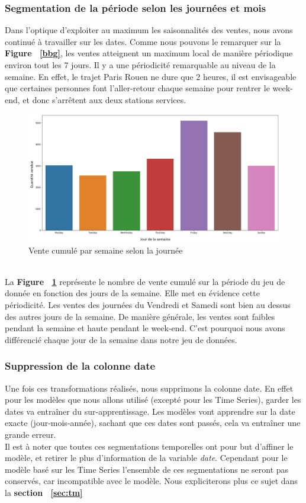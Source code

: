 \documentclass{article} %
\begin{document}
\subsubsection{Segmentation de la période selon les journées et mois}
Dans l'optique d'exploiter au maximum les saisonnalités des ventes, nous avons continué à travailler sur les dates. Comme nous pouvons le remarquer sur la \textbf{Figure ~\ref{bbg}}, les ventes atteignent un maximum local de manière périodique environ tout les 7 jours. Il y a une périodicité remarquable au niveau de la semaine. En effet, le trajet Paris Rouen ne dure que 2 heures, il est envisageable que certaines personnes font l'aller-retour chaque semaine pour rentrer le week-end, et donc s'arrêtent aux deux stations services.\\
\begin{figure}[!h]
	\centering
	\includegraphics[keepaspectratio = true,scale=0.65]{vente_week.png}
	\caption{Vente cumulé par semaine selon la journée}
	\label{bb1}
\end{figure}
~\\
La \textbf{Figure ~\ref{bb1}} représente le nombre de vente cumulé sur la période du jeu de donnée en fonction des jours de la semaine. Elle met en évidence cette périodicité. Les ventes des journées du Vendredi et Samedi sont bien au dessus des autres jours de la semaine. De manière générale, les ventes sont faibles pendant la semaine et haute pendant le week-end. C'est pourquoi nous avons différencié chaque jour de la semaine dans notre jeu de données.\\
\subsubsection{Suppression de la colonne date}
Une fois ces transformations réalisés, nous supprimons la colonne date. En effet pour les modèles que nous allons utilisé (excepté pour les Time Series), garder les dates va entraîner du sur-apprentissage. Les modèles vont apprendre sur la date exacte (jour-mois-année), sachant que ces dates sont passés, cela va entraîner une grande erreur.\\
Il est à noter que toutes ces segmentations temporelles ont pour but d'affiner le modèle, et retirer le plus d'information de la variable \textit{date}. Cependant pour le modèle basé sur les Time Series l'ensemble de ces segmentations ne seront pas conservés, car incompatible avec le modèle. Nous expliciterons plus ce sujet dans la \textbf{section ~\ref{sec:tm}}
\end{document}
